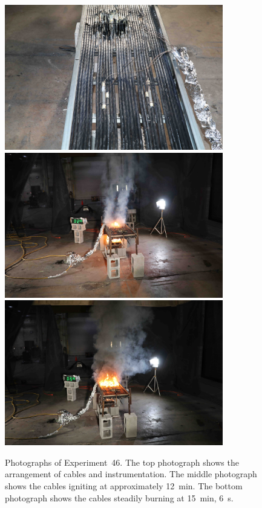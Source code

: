 \begin{figure}[p]
\centering
\includegraphics[height=2.50in]{../FIGURES/Test_46_setup} \\
\includegraphics[height=2.50in]{../FIGURES/Test_46_ignition} \\
\includegraphics[height=2.50in]{../FIGURES/Test_46_burning}
\caption[Photographs of Experiment~46]{Photographs of Experiment~46. The top photograph shows the arrangement of cables and instrumentation. The middle photograph shows the cables igniting at approximately 12~min. The bottom photograph shows the cables steadily burning at 15~min, 6~s.}
\label{fig:Test_46_photos}
\end{figure}


